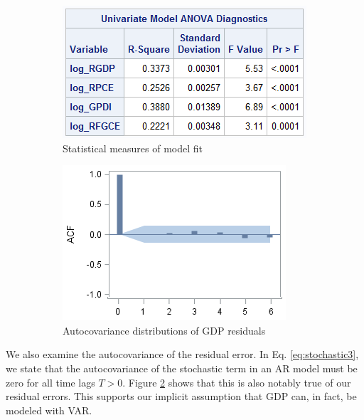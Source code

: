     \begin{figure}[!h]
        \begin{subfigure}{0.5\textwidth}
            \begin{center}
            \includegraphics[width=\textwidth]{../img/model1-fitstats.png}
            \end{center}
            \caption{Statistical measures of model fit}
        \end{subfigure}
        \begin{subfigure}{0.5\textwidth}
            \begin{center}
            \includegraphics[width=\textwidth]{../img/model1-residualdiagnostics.png}
            \end{center}
            \caption{Autocovariance distributions of GDP residuals}
            \label{fig:residualdiag}
        \end{subfigure}
        \caption{}
    \end{figure}

    We also examine the autocovariance of the residual error.  In Eq. \ref{eq:stochastic3},
    we state that the autocovariance of the stochastic term in an AR model must
    be zero for all time lags $T > 0$.  Figure \ref{fig:residualdiag} shows that
    this is also notably true of our residual errors.  This supports our implicit
    assumption that GDP can, in fact, be modeled with VAR.
    